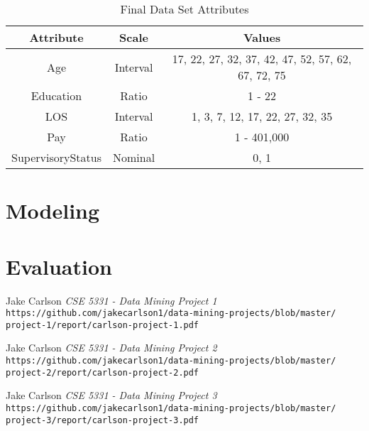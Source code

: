 \documentclass{article}
\begin{document}
    \begin{center}
        \begin{table}
            \centering
            \begin{tabular}{ |c|c|c| }
                \hline
                Attribute & Scale & Values \\
                \hline
                Age & Interval & 17, 22, 27, 32, 37, 42, 47, 52, 57, 62, 67, 72, 75 \\
                Education & Ratio & 1 - 22 \\
                LOS & Interval & 1, 3, 7, 12, 17, 22, 27, 32, 35 \\
                Pay & Ratio & 1 - 401,000 \\
                SupervisoryStatus & Nominal & 0, 1 \\
                \hline
            \end{tabular}
            \caption{Final Data Set Attributes}
            \label{tab:1}
        \end{table}
    \end{center}

\section{Modeling}

\section{Evaluation}

\begin{thebibliography}{10}
    Jake Carlson
    \textit{CSE 5331 - Data Mining Project 1}
    \texttt{https://github.com/jakecarlson1/data-mining-projects/blob/master/}
    \texttt{project-1/report/carlson-project-1.pdf}

    Jake Carlson
    \textit{CSE 5331 - Data Mining Project 2}
    \texttt{https://github.com/jakecarlson1/data-mining-projects/blob/master/}
    \texttt{project-2/report/carlson-project-2.pdf}

    Jake Carlson
    \textit{CSE 5331 - Data Mining Project 3}
    \texttt{https://github.com/jakecarlson1/data-mining-projects/blob/master/}
    \texttt{project-3/report/carlson-project-3.pdf}

\end{thebibliography}
\end{document}
